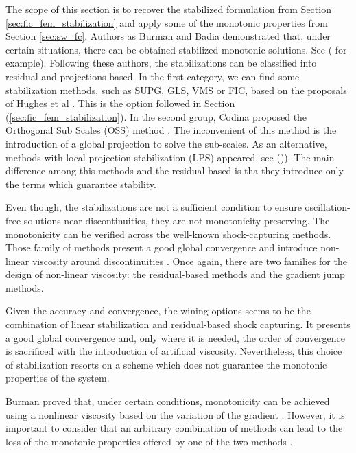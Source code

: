 The scope of this section is to recover the stabilized formulation from Section \ref{sec:fic_fem_stabilization} and apply some of the monotonic properties from Section \ref{sec:sw_fc}. Authors as Burman and Badia demonstrated that, under certain situations, there can be obtained stabilized monotonic solutions. See (\cite{burman2007, burman2010, badia2014} for example).
Following these authors, the stabilizations can be classified into residual and projections-based. In the first category, we can find some stabilization methods, such as SUPG, GLS, VMS or FIC, based on the proposals of Hughes et al \cite{brooks1982,hughes1989,hughes1995}. This is the option followed in Section (\ref{sec:fic_fem_stabilization}). 
In the second group, Codina proposed the Orthogonal Sub Scales (OSS) method \cite{codina2000}. The inconvenient of this method is the introduction of a global projection to solve the sub-scales. As an alternative, methods with local projection stabilization (LPS) appeared, see (\cite{braak2006,badia2012,badia2014,burman2015,matthies2007})). The main difference among this methods and the residual-based is tha they introduce only the terms which guarantee stability.

Even though, the stabilizations are not a sufficient condition to ensure oscillation-free solutions near discontinuities, they are not monotonicity preserving. The monotonicity can be verified across the well-known shock-capturing methods.
Those family of methods present a good global convergence and introduce non-linear viscosity around discontinuities \cite{Johnson1990}.
Once again, there are two families for the design of non-linear viscosity: the residual-based methods and the gradient jump methods.

Given the accuracy and convergence, the wining options seems to be the combination of linear stabilization and residual-based shock capturing. It presents a good global convergence and, only where it is needed, the order of convergence is sacrificed with the introduction of artificial viscosity. Nevertheless, this choice of stabilization resorts on a scheme which does not guarantee the monotonic properties of the system.

Burman proved that, under certain conditions, monotonicity can be achieved using a nonlinear viscosity based on the variation of the gradient \cite{burman2007}. However, it is important to consider that an arbitrary combination of methods can lead to the loss of the monotonic properties offered by one of the two methods \cite{badia2014}.




